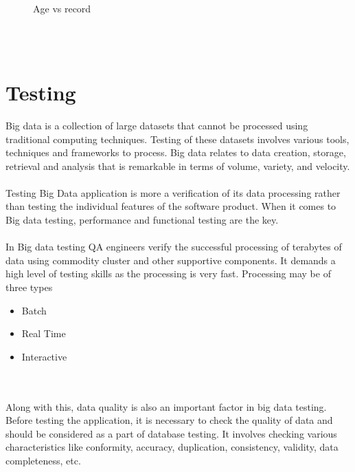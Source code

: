 \begin{itemize}
\begin{figure}[h!]
	\caption{Age vs record}
\end{figure}
%
\\
\\



\section{Testing}
Big data is a collection of large datasets that cannot be processed using traditional computing techniques. Testing of these datasets involves various tools, techniques and frameworks to process. Big data relates to data creation, storage, retrieval and analysis that is remarkable in terms of volume, variety, and velocity.
\\
\\
Testing Big Data application is more a verification of its data processing rather than testing the individual features of the software product. When it comes to Big data testing, performance and functional testing are the key.
\\
\\
In Big data testing QA engineers verify the successful processing of terabytes of data using commodity cluster and other supportive components. It demands a high level of testing skills as the processing is very fast. Processing may be of three types
\begin{itemize}
	\item Batch
	\item Real Time
	\item Interactive
\end{itemize}
\\
\\
Along with this, data quality is also an important factor in big data testing. Before testing the application, it is necessary to check the quality of data and should be considered as a part of database testing. It involves checking various characteristics like conformity, accuracy, duplication, consistency, validity, data completeness, etc.


\end{itemize}
